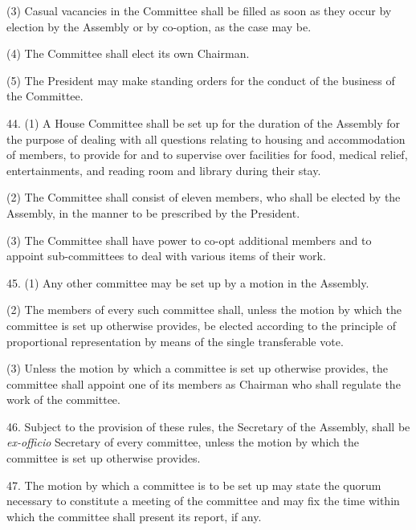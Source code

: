 (3) Casual vacancies in the Committee shall be filled as soon as they occur by election by the Assembly or by co-option, as the case may be.



(4) The Committee shall elect its own Chairman.



(5) The President may make standing orders for the conduct of the business of the Committee.



44. (1) A House Committee shall be set up for the duration of the Assembly for the purpose of dealing with all questions relating to housing and accommodation of members, to provide for and to supervise over facilities for food, medical relief, entertainments, and reading room and library during their stay.



(2) The Committee shall consist of eleven members, who shall be elected by the Assembly, in the manner to be prescribed by the President.



(3) The Committee shall have power to co-opt additional members and to appoint sub-committees to deal with various items of their work.



45. (1) Any other committee may be set up by a motion in the Assembly.



(2) The members of every such committee shall, unless the motion by which the committee is set up otherwise provides, be elected according to the principle of proportional representation by means of the single transferable vote.



(3) Unless the motion by which a committee is set up otherwise provides, the committee shall appoint one of its members as Chairman who shall regulate the work of the committee.



46. Subject to the provision of these rules, the Secretary of the Assembly, shall be \emph{ex-officio} Secretary of every committee, unless the motion by which the committee is set up otherwise provides.



47. The motion by which a committee is to be set up may state the quorum necessary to constitute a meeting of the committee and may fix the time within which the committee shall present its report, if any.



